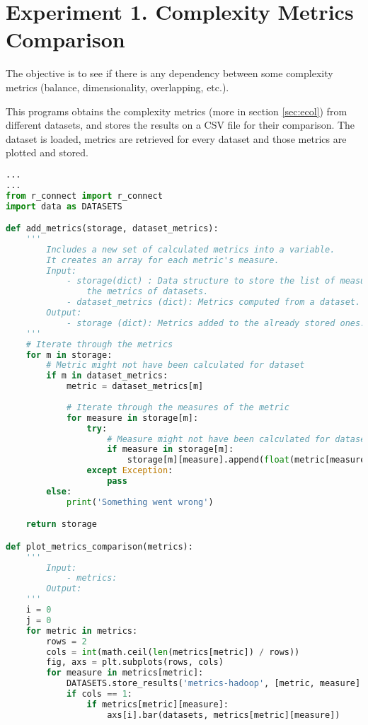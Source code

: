 \section{Experiment 1. Complexity Metrics Comparison}
\label{sec:exp-compl-metrics-code}

The objective is to see if there is any dependency between some complexity 
metrics (balance, dimensionality, overlapping, etc.). 

This programs obtains the complexity metrics (more in section \ref{sec:ecol}) 
from different datasets, and stores the results on a CSV file for their 
comparison. The dataset is loaded, metrics are retrieved for every dataset and 
those metrics are plotted and stored.

\begin{lstlisting}[language=Python, caption={Compare complexity metrics of 
different datasets}, label={lst:metrics-comparison}]
...
...
from r_connect import r_connect
import data as DATASETS

def add_metrics(storage, dataset_metrics):
    '''
        Includes a new set of calculated metrics into a variable.
        It creates an array for each metric's measure.
        Input:
            - storage(dict) : Data structure to store the list of measures from 
                the metrics of datasets.
            - dataset_metrics (dict): Metrics computed from a dataset.
        Output:
            - storage (dict): Metrics added to the already stored ones.
    '''
    # Iterate through the metrics
    for m in storage:
        # Metric might not have been calculated for dataset
        if m in dataset_metrics:
            metric = dataset_metrics[m]
      
            # Iterate through the measures of the metric
            for measure in storage[m]:
                try:
                    # Measure might not have been calculated for dataset
                    if measure in storage[m]:
                        storage[m][measure].append(float(metric[measure]))
                except Exception:
                    pass
        else:
            print('Something went wrong')

    return storage

def plot_metrics_comparison(metrics):
    '''
        Input:
            - metrics:
        Output:
    '''
    i = 0
    j = 0
    for metric in metrics:
        rows = 2
        cols = int(math.ceil(len(metrics[metric]) / rows))
        fig, axs = plt.subplots(rows, cols)
        for measure in metrics[metric]:
            DATASETS.store_results('metrics-hadoop', [metric, measure] + [round(i, 4) for i in metrics[metric][measure]])
            if cols == 1:
                if metrics[metric][measure]:
                    axs[i].bar(datasets, metrics[metric][measure])
                

\end{lstlisting}
